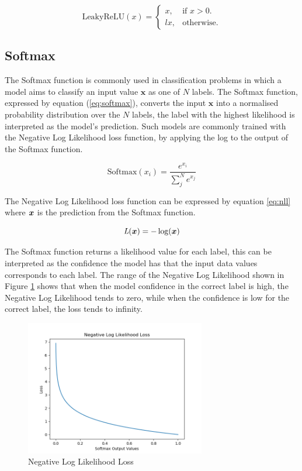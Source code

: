 \begin{equation}\label{eq:lrelu}
    \text{LeakyReLU}(x)=\begin{cases}
      x, & \text{if $x>0$}.\\
      lx, & \text{otherwise}.
    \end{cases}
\end{equation}

\subsection{Softmax} \label{softmax}
The Softmax function is commonly used in classification problems in which a model aims to classify an input value $\bm{x}$ as one of $N$ labels.
The Softmax function, expressed by equation (\ref{eq:softmax}), converts the input $\bm{x}$ into a normalised probability distribution over the $N$ labels, the label with the highest likelihood is interpreted as the model's prediction. 
Such models are commonly trained with the Negative Log Likelihood loss function, by applying the log to the output of the Softmax function.

\begin{equation}\label{eq:softmax}
    \text{Softmax}(x_i) = \frac{e^{x_i}}{\sum_j^N e^{x_j}}
\end{equation}

The Negative Log Likelihood loss function can be expressed by equation \ref{eq:nll} where ${\boldsymbol{{x}}}$ is the prediction from the Softmax function.

\begin{equation}\label{eq:nll}
    \textit{L}({\boldsymbol{{x}}}) = -\log ({\boldsymbol{{x}}})
\end{equation}

The Softmax function returns a likelihood value for each label, this can be interpreted as the confidence the model has that the input data values corresponds to each label.
The range of the Negative Log Likelihood shown in Figure \ref{fig:nll} shows that when the model confidence in the correct label is high, the Negative Log Likelihood tends to zero, while when the confidence is low for the correct label, the loss tends to infinity.

\begin{figure}[h]
    \centering
        \includegraphics[width=0.7\textwidth]{figures/dl/nll.png}
    \caption{Negative Log Likelihood Loss}\label{fig:nll}
\end{figure}

